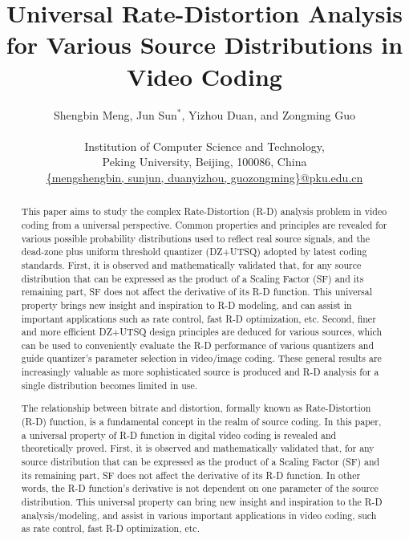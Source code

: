 \documentclass[smallabstract,smallcaptions]{dccpaper}
\begin{document}
\title
{\large
\textbf{Universal Rate-Distortion Analysis for Various Source Distributions in Video Coding}
}

\author{%
Shengbin Meng, Jun Sun$^{\ast}$, Yizhou Duan, and Zongming Guo\\[0.5em]
{\small\begin{minipage}{\linewidth}\begin{center}
\begin{tabular}{ccc}
Institution of Computer Science and Technology, \\
Peking University, Beijing, 100086, China\\
\url{{mengshengbin, sunjun, duanyizhou, guozongming}@pku.edu.cn}
\end{tabular}
\end{center}\end{minipage}}
}

\maketitle
\thispagestyle{empty}

\begin{abstract}
This paper aims to study the complex Rate-Distortion (R-D) analysis problem in video coding from a universal perspective. Common properties and principles are revealed for various possible probability distributions used to reflect real source signals, and the dead-zone plus uniform threshold quantizer (DZ+UTSQ) adopted by latest coding standards. First, it is observed and mathematically validated that, for any source distribution that can be expressed as the product of a Scaling Factor (SF) and its remaining part, SF does not affect the derivative of its R-D function. This universal property brings new insight and inspiration to R-D modeling, and can assist in important applications such as rate control, fast R-D optimization, etc. Second, finer and more efficient DZ+UTSQ design principles are deduced for various sources, which can be used to conveniently evaluate the R-D performance of various quantizers and guide quantizer's parameter selection in video/image coding. These general results are increasingly valuable as more sophisticated source is produced and R-D analysis for a single distribution becomes limited in use.

The relationship between bitrate and distortion, formally known as Rate-Distortion (R-D) function, is a fundamental concept in the realm of source coding. In this paper, a universal property of R-D function in digital video coding is revealed and theoretically proved. First, it is observed and mathematically validated that, for any source distribution that can be expressed as the product of a Scaling Factor (SF) and its remaining part, SF does not affect the derivative of its R-D function. In other words, the R-D function's derivative is not dependent on one parameter of the source distribution. This universal property can bring new insight and inspiration to the R-D analysis/modeling, and assist in various important applications in video coding, such as rate control, fast R-D optimization, etc.
\end{abstract}
\end{document}

